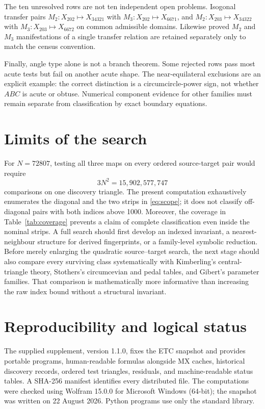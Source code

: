 \documentclass[11pt]{article}
\begin{document}
The ten unresolved rows are not ten independent open problems.
Isogonal transfer pairs
$M_2:X_{202}\mapsto X_{34321}$ with
$M_3:X_{202}\mapsto X_{6671}$, and
$M_2:X_{203}\mapsto X_{34322}$ with
$M_3:X_{203}\mapsto X_{6672}$ on common admissible domains.
Likewise proved $M_2$ and $M_3$ manifestations of a single transfer
relation are retained separately only to match the census convention.

Finally, angle type alone is not a branch theorem.
Some rejected rows pass most acute tests but fail on another acute shape.
The near-equilateral exclusions are an explicit example:
the correct distinction is a circumcircle-power sign, not whether $ABC$
is acute or obtuse.  Numerical component evidence for other families must
remain separate from classification by exact boundary equations.

\section{Limits of the search}

For $N=72807$, testing all three maps on every ordered source-target pair
would require
\[
 3N^2=15{,}902{,}577{,}747
\]
comparisons on one discovery triangle.  The present computation exhaustively
enumerates the diagonal and the two strips in \eqref{eq:scope}; it does not
classify off-diagonal pairs with both indices above 1000.  Moreover, the
coverage in Table~\ref{tab:coverage} prevents a claim of complete
classification even inside the nominal strips.  A full search should first
develop an indexed invariant, a nearest-neighbour structure for derived
fingerprints, or a family-level symbolic reduction.  Before merely enlarging
the quadratic source--target search, the next stage should also compare every
surviving class systematically with Kimberling's central-triangle theory,
Stothers's circumcevian and pedal tables, and Gibert's parameter families.
That comparison is mathematically more informative than increasing the raw
index bound without a structural invariant.

\section{Reproducibility and logical status}

The supplied supplement, version 1.1.0, fixes the ETC snapshot and provides
portable programs, human-readable formulas alongside MX caches,
historical discovery records, ordered test triangles, residuals, and
machine-readable status tables.  A SHA-256 manifest identifies every
distributed file.  The computations were checked using Wolfram 15.0.0
for Microsoft Windows (64-bit); the snapshot was written on 22 August 2026.
Python programs use only the standard library.
\end{document}
